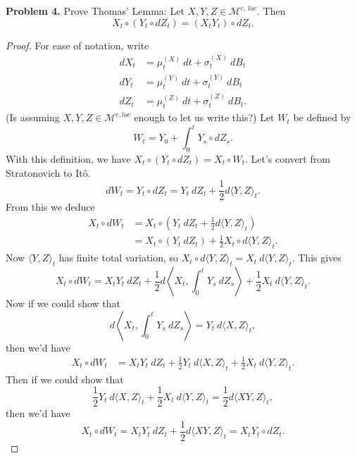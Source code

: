 \documentclass[11pt,letterpaper]{report}
\newcommand{\mcal}[1]{\mathcal{#1}}
\begin{document}
\noindent\textbf{Problem 4. }
Prove Thomas' Lemma: Let $X, Y, Z\in \mcal{M}^{c,\ loc}$. Then
\[
X_t\circ (Y_t\circ dZ_t) = (X_tY_t)\circ dZ_t.
\]
\begin{proof}
	For ease of notation, write
	\begin{align*}
		dX_t &= \mu^{(X)}_t\ dt + \sigma^{(X)}_t\ dB_t\\
		dY_t &= \mu^{(Y)}_t\ dt + \sigma^{(Y)}_t\ dB_t\\
		dZ_t &= \mu^{(Z)}_t\ dt + \sigma^{(Z)}_t\ dB_t.
	\end{align*}
	(Is assuming $X,Y,Z\in \mcal{M}^{c, loc}$ enough to let us write this?) Let $W_t$ be defined by
	\[
	W_t = Y_0 + \int_0^tY_s\circ dZ_s.
	\]
	With this definition, we have $X_t\circ (Y_t\circ dZ_t) = X_t\circ W_t$. Let's convert from Stratonovich to It\^o.
	\[
	dW_t = Y_t\circ dZ_t = Y_t\ dZ_t + \frac{1}{2}d\langle Y, Z\rangle_t.
	\]
	From this we deduce
	\begin{align*}
		X_t\circ dW_t &= X_t\circ \left(Y_t\ dZ_t + \frac{1}{2}d\langle Y, Z\rangle_t\right)\\
		&= X_t\circ (Y_t\ dZ_t) + \frac{1}{2}X_t\circ d\langle Y, Z\rangle_t.
	\end{align*}
	Now $\langle Y, Z\rangle_t$ has finite total variation, so $X_t\circ d\langle Y, Z\rangle_t = X_t\ d\langle Y, Z\rangle_t$. This gives
	\[
	X_t\circ dW_t = X_tY_t\ dZ_t + \frac{1}{2}d\left\langle X_t, \int_0^tY_s\ dZ_s\right\rangle + \frac{1}{2}X_t\ d\langle Y, Z\rangle_t.
	\]
	Now if we could show that
	\[
	d\left\langle X_t, \int_0^tY_s\ dZ_s\right\rangle = Y_t\ d\langle X, Z\rangle_t,
	\]
	then we'd have 
	\begin{align*}
		X_t\circ dW_t &= X_tY_t\ dZ_t + \frac{1}{2}Y_t\ d\langle X, Z\rangle_t + \frac{1}{2}X_t\ d\langle Y, Z\rangle_t.
	\end{align*}
	Then if we could show that
	\[
	\frac{1}{2}Y_t\ d\langle X, Z\rangle_t + \frac{1}{2}X_t\ d\langle Y, Z\rangle_t = \frac{1}{2}d\langle XY, Z\rangle_t,
	\]
	then we'd have
	\[
	X_t\circ dW_t  = X_tY_t\ dZ_t + \frac{1}{2}d\langle XY, Z\rangle_t = X_tY_t\circ dZ_t.
	\]
\end{proof}
\end{document}
